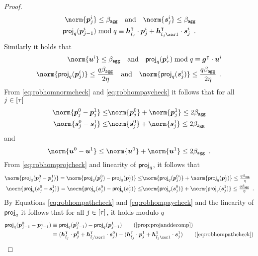 \begin{proof}
\begin{align}
  \norm{\vec{p}^i_{j}} \leq \bagg\quad\text{and}\quad
  \norm{\vec{s}^i_{j}} \leq \bagg\label{eq:robhomnormcheck}\\
  \proj_q(\vec{p}^i_{j-1})\bmod q \equiv \vec{h}_{\tilde t_j}^\transpose\cdot \vec{p}^i_{j} + \vec{h}_{\tilde t_j\xor 1}^\transpose \cdot \vec{s}^i_{j}\enspace.\label{eq:robhompathcheck}
  \end{align}
  Similarly it holds that
  \begin{align}
  \norm{\vec{u}^i} \leq \bagg\quad \text{and}\quad \proj_q(\vec{p}^i_{\tau})\bmod q \equiv \vec{g}^\transpose\cdot \vec{u}^i\label{eq:robhompaycheck}\\
  \norm{\proj_q(\vec{p}_j^i)}\leq \frac{q\bagg}{2\eta}\quad\text{and}\quad \norm{\proj_q(\vec{s}_j^i)}\leq \frac{q\bagg}{2\eta}\enspace.\label{eq:robhomprojcheck}
  \end{align}
From \autoref{eq:robhomnormcheck} and \autoref{eq:robhompaycheck} it follows that for all $j \in [\tau]$
  \begin{align*}
    \norm{\vec{p}_j^0-\vec{p}_j^1} \leq& \norm{\vec{p}_j^0} + \norm{\vec{p}_j^1} \leq 2\bagg\\
    \norm{\vec{s}_j^0-\vec{s}_j^1} \leq& \norm{\vec{s}_j^0} + \norm{\vec{s}_j^1} \leq 2\bagg
  \end{align*}
  and
  \[
      \norm{\vec{u}^0-\vec{u}^1} \leq \norm{\vec{u}^0} + \norm{\vec{u}^1} \leq 2\bagg\enspace.
  \]
  From \autoref{eq:robhomprojcheck} and linearity of $\mathsf{proj}_q$, it follows that
\begin{align*}
 \norm{\proj_q(\vec{p}_j^0 - \vec{p}_j^1)} = \norm{\proj_q(\vec{p}_j^0)-\proj_q(\vec{p}_j^1)} \leq& \norm{\proj_q(\vec{p}_j^0)} + \norm{\proj_q(\vec{p}_j^1)} \leq \tfrac{q\bagg}{\eta}\\
 \norm{\proj_q(\vec{s}_j^0 - \vec{s}_j^1)} = \norm{\proj_q(\vec{s}_j^0)-\proj_q(\vec{s}_j^1)} \leq& \norm{\proj_q(\vec{s}_j^0)} + \norm{\proj_q(\vec{s}_j^1)} \leq \tfrac{q\bagg}{\eta}\enspace.
\end{align*}
%
By Equations \ref{eq:robhompathcheck} and \ref{eq:robhompaycheck} and the linearity of $\mathsf{proj}_q$ it follows that for all $j \in [\tau]$, it holds modulo $q$
  \begin{align*}
    \proj_q(\vec{p}^0_{j-1}-\vec{p}^1_{j-1})
    \equiv{}&\proj_q(\vec{p}^0_{j-1})-\proj_q(\vec{p}^1_{j-1})\tag{\autoref{prop:projanddecomp}}\\
    \equiv{}&(\vec{h}_{\tilde t_j}^\transpose\cdot \vec{p}^0_{j} + \vec{h}_{\tilde t_j\xor 1}^\transpose \cdot \vec{s}^0_{j})- (\vec{h}_{\tilde t_j}^\transpose\cdot \vec{p}^1_{j} + \vec{h}_{\tilde t_j\xor 1}^\transpose \cdot \vec{s}^1_{j})\tag{\autoref{eq:robhompathcheck}}\\

\end{align*}
\end{proof}
